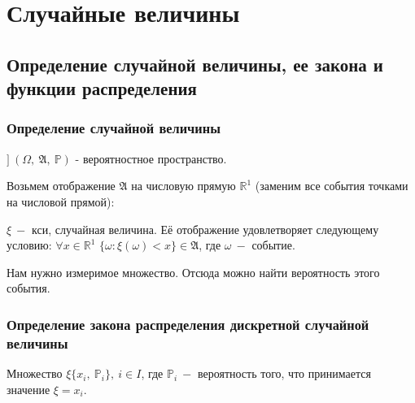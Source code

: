 \documentclass[../Main.tex]{subfiles}
\begin{document}
\chapter{Случайные величины}

\section{Определение случайной величины, ее закона и функции распределения}

\subsection{Определение случайной величины}


\(] \ (\Omega, \ \mathfrak{A}, \ \mathbb{P})\) - вероятностное пространство.


Возьмем отображение \(\mathfrak{A}\) на числовую прямую \(\mathbb{R}^1\) (заменим все события точками на числовой прямой):

\(\xi \ -\) кси, случайная величина. Её отображение удовлетворяет следующему условию: \(\forall x \in \mathbb{R}^1\) \(\{\omega: \xi (\omega) < x \} \in \mathfrak{A}\), где \(\omega \ -\) событие.

Нам нужно измеримое множество. Отсюда можно найти вероятность этого события.


\subsection{Определение закона распределения дискретной случайной величины}


Множество \(\xi\{x_i, \ \mathbb{P}_i \}, \ i \in I\), где \(\mathbb{P}_i \ -\) вероятность того, что принимается значение \(\xi = x_i\). 
\end{document}
